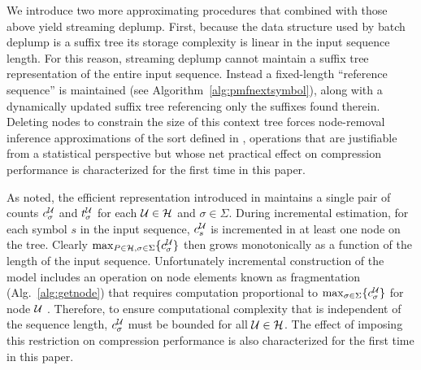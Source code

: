 We introduce two more approximating procedures that combined with those above yield streaming deplump.  First, because the data structure used by batch deplump is a suffix tree its storage complexity is linear in the input sequence length.  For this reason, streaming deplump cannot maintain a suffix tree representation of the entire input sequence.  Instead a fixed-length ``reference sequence''  is maintained (see Algorithm~\ref{alg:pmfnextsymbol}), along with a dynamically updated suffix tree referencing only the suffixes found therein.  Deleting nodes to constrain the size of this context tree forces node-removal inference approximations of the sort defined in \citep{Bartlett2010}, operations that are justifiable from a statistical perspective but whose net practical effect on compression performance is characterized for the first time in this paper. %

As noted, the efficient representation introduced in \cite{Gasthaus2011} maintains a single pair of counts $c^\U_\sigma$ and $t^\U_\sigma$ for each $\U \in \mathcal{H}$ and $\sigma \in \Sigma$.  During incremental estimation, for each symbol $s$ in the input sequence, $c^\U_s$ is incremented in at least one node on the tree.  Clearly $\max_{P \in \mathcal{H}, \sigma \in \Sigma} \{ c^\U_\sigma \}$ then grows monotonically as a function of the length of the input sequence. Unfortunately incremental construction of the model includes an operation on node elements known as fragmentation (Alg.~\ref{alg:getnode}) that requires computation proportional to $\max_{\sigma \in \Sigma} \{ c_\sigma^\U \}$ for node $\U$ \citep{Gasthaus2011}. Therefore, to ensure computational complexity that is independent of the sequence length, $c^\U_\sigma$ must be bounded for all $\U \in \mathcal{H}$.  The effect of imposing this restriction on compression performance is also characterized for the first time in this paper. 






